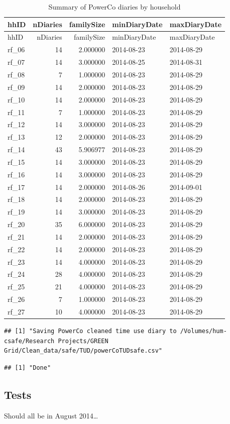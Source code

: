 \documentclass[]{article}
\begin{document}
\begin{longtable}[]{@{}lrrll@{}}
\caption{Summary of PowerCo diaries by household}\tabularnewline
\toprule
hhID & nDiaries & familySize & minDiaryDate &
maxDiaryDate\tabularnewline
\midrule
\endfirsthead
\toprule
hhID & nDiaries & familySize & minDiaryDate &
maxDiaryDate\tabularnewline
\midrule
\endhead
rf\_06 & 14 & 2.000000 & 2014-08-23 & 2014-08-29\tabularnewline
rf\_07 & 14 & 3.000000 & 2014-08-25 & 2014-08-31\tabularnewline
rf\_08 & 7 & 1.000000 & 2014-08-23 & 2014-08-29\tabularnewline
rf\_09 & 14 & 2.000000 & 2014-08-23 & 2014-08-29\tabularnewline
rf\_10 & 14 & 2.000000 & 2014-08-23 & 2014-08-29\tabularnewline
rf\_11 & 7 & 1.000000 & 2014-08-23 & 2014-08-29\tabularnewline
rf\_12 & 14 & 3.000000 & 2014-08-23 & 2014-08-29\tabularnewline
rf\_13 & 12 & 2.000000 & 2014-08-23 & 2014-08-29\tabularnewline
rf\_14 & 43 & 5.906977 & 2014-08-23 & 2014-08-29\tabularnewline
rf\_15 & 14 & 3.000000 & 2014-08-23 & 2014-08-29\tabularnewline
rf\_16 & 14 & 3.000000 & 2014-08-23 & 2014-08-29\tabularnewline
rf\_17 & 14 & 2.000000 & 2014-08-26 & 2014-09-01\tabularnewline
rf\_18 & 14 & 2.000000 & 2014-08-23 & 2014-08-29\tabularnewline
rf\_19 & 14 & 3.000000 & 2014-08-23 & 2014-08-29\tabularnewline
rf\_20 & 35 & 6.000000 & 2014-08-23 & 2014-08-29\tabularnewline
rf\_21 & 14 & 2.000000 & 2014-08-23 & 2014-08-29\tabularnewline
rf\_22 & 14 & 2.000000 & 2014-08-23 & 2014-08-29\tabularnewline
rf\_23 & 14 & 4.000000 & 2014-08-23 & 2014-08-29\tabularnewline
rf\_24 & 28 & 4.000000 & 2014-08-23 & 2014-08-29\tabularnewline
rf\_25 & 21 & 4.000000 & 2014-08-23 & 2014-08-29\tabularnewline
rf\_26 & 7 & 1.000000 & 2014-08-23 & 2014-08-29\tabularnewline
rf\_27 & 10 & 4.000000 & 2014-08-23 & 2014-08-29\tabularnewline
\bottomrule
\end{longtable}

\begin{verbatim}
## [1] "Saving PowerCo cleaned time use diary to /Volumes/hum-csafe/Research Projects/GREEN Grid/Clean_data/safe/TUD/powerCoTUDsafe.csv"
\end{verbatim}

\begin{verbatim}
## [1] "Done"
\end{verbatim}

\subsection{Tests}\label{tests}

Should all be in August 2014\ldots{}
\end{document}
